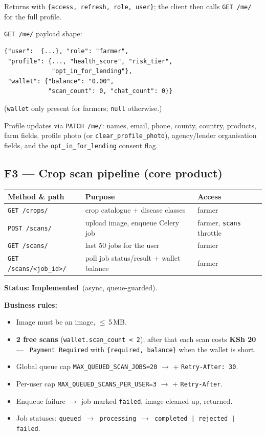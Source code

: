 \documentclass[11pt,a4paper]{article}
\newcommand{\done}{\textcolor{statusdone}{\textbf{Implemented}}}
\newcommand{\code}[1]{\texttt{\allowbreak #1\allowbreak}}
\begin{document}
Returns \code{201} with \code{\{access, refresh, role, user\}}; the client
then calls \code{GET /me/} for the full profile.

\code{GET /me/} payload shape:
\begin{verbatim}
{"user":  {...}, "role": "farmer",
 "profile": {..., "health_score", "risk_tier",
             "opt_in_for_lending"},
 "wallet": {"balance": "0.00",
            "scan_count": 0, "chat_count": 0}}
\end{verbatim}
(\code{wallet} only present for farmers; \code{null} otherwise.)

Profile updates via \code{PATCH /me/}: names, email, phone, county,
country, products, farm fields, profile photo (or
\code{clear\_profile\_photo}), agency/lender organisation fields, and the
\code{opt\_in\_for\_lending} consent flag.

\subsection{F3 --- Crop scan pipeline (core product)}
\begin{center}
\small
\begin{tabularx}{\textwidth}{@{} l X l @{}}
\toprule
\textbf{Method \& path} & \textbf{Purpose} & \textbf{Access} \\
\midrule
\code{GET  /crops/}        & crop catalogue + disease classes & farmer \\
\code{POST /scans/}        & upload image, enqueue Celery job & farmer, \code{scans} throttle \\
\code{GET  /scans/}        & last 50 jobs for the user & farmer \\
\code{GET  /scans/<job\_id>/} & poll job status/result + wallet balance & farmer \\
\bottomrule
\end{tabularx}
\end{center}

\textbf{Status:} \done\ (async, queue-guarded).

\textbf{Business rules:}
\begin{itemize}
  \item Image must be an image, $\leq$\,5\,MB.
  \item \textbf{2 free scans} (\code{wallet.scan\_count < 2}); after that each
        scan costs \textbf{KSh 20} --- \code{402 Payment Required} with
        \code{\{required, balance\}} when the wallet is short.
  \item Global queue cap \code{MAX\_QUEUED\_SCAN\_JOBS=20} $\rightarrow$
        \code{503} + \code{Retry-After: 30}.
  \item Per-user cap \code{MAX\_QUEUED\_SCANS\_PER\_USER=3} $\rightarrow$
        \code{429} + \code{Retry-After}.
  \item Enqueue failure $\rightarrow$ job marked \code{failed}, image cleaned
        up, \code{503} returned.
  \item Job statuses: \code{queued $\rightarrow$ processing $\rightarrow$
        completed | rejected | failed}.
\end{itemize}
\end{document}
